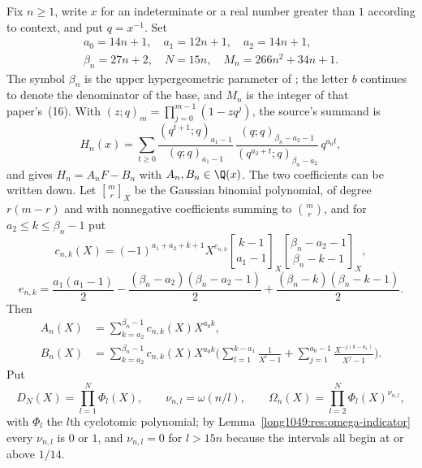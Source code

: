 \documentclass[11pt]{article}
\begin{document}
Fix $n\ge1$, write $x$ for an indeterminate or a real number greater than $1$
according to context, and put $q=x^{-1}$.  Set
\[
\begin{gathered}
 a_0=14n+1,\quad a_1=12n+1,\quad a_2=14n+1,\\
 \beta_n=27n+2,\quad N=15n,\quad M_n=266n^{2}+34n+1 .
\end{gathered}
\]
The symbol $\beta_n$ is the upper hypergeometric parameter of
\cite[Sec.~2]{zudilin2004}; the letter $b$ continues to denote the denominator
of the base, and $M_n$ is the integer of that paper's~(16).  With
$(z;q)_m=\prod_{j=0}^{m-1}(1-zq^{j})$, the source's summand is
\begin{equation}\label{long1049:eq:positive-source-form}
 H_n(x)=\sum_{t\ge0}
 \frac{(q^{t+1};q)_{a_1-1}}{(q;q)_{a_1-1}}\,
 \frac{(q;q)_{\beta_n-a_2-1}}{(q^{a_2+t};q)_{\beta_n-a_2}}\,q^{a_0t},
\end{equation}
and \cite[(8)--(11)]{zudilin2004} gives $H_n=A_nF-B_n$ with
$A_n,B_n\in\Q(x)$.  The two coefficients can be written down.  Let
$\genfrac{[}{]}{0pt}{}{m}{r}_X$ be the Gaussian binomial polynomial, of degree
$r(m-r)$ and with nonnegative coefficients summing to $\binom{m}{r}$, and for
$a_2\le k\le\beta_n-1$ put
\begin{equation}\label{long1049:eq:c-explicit}
 c_{n,k}(X)=(-1)^{a_1+a_2+k+1}X^{e_{n,k}}
 \genfrac{[}{]}{0pt}{}{k-1}{a_1-1}_X
 \genfrac{[}{]}{0pt}{}{\beta_n-a_2-1}{\beta_n-k-1}_X,
\end{equation}
\[
 e_{n,k}=\frac{a_1(a_1-1)}2-\frac{(\beta_n-a_2)(\beta_n-a_2-1)}2
 +\frac{(\beta_n-k)(\beta_n-k-1)}2 .
\]
Then
\begin{align}
 A_n(X)&=\sum_{k=a_2}^{\beta_n-1}c_{n,k}(X)X^{a_0k},\label{long1049:eq:A-explicit}\\
 B_n(X)&=\sum_{k=a_2}^{\beta_n-1}c_{n,k}(X)X^{a_0k}
 \biggl(\sum_{l=1}^{k-a_1}\frac1{X^{l}-1}
 +\sum_{j=1}^{a_0-1}\frac{X^{-j(k-a_1)}}{X^{j}-1}\biggr).\label{long1049:eq:B-explicit}
\end{align}
Put
\begin{equation}\label{long1049:eq:cyclotomic-products}
 D_N(X)=\prod_{l=1}^{N}\Phi_l(X),\qquad
 \nu_{n,l}=\omega(n/l),\qquad
 \Omega_n(X)=\prod_{l=2}^{N}\Phi_l(X)^{\nu_{n,l}},
\end{equation}
with $\Phi_l$ the $l$th cyclotomic polynomial; by
Lemma~\ref{long1049:res:omega-indicator} every $\nu_{n,l}$ is $0$ or $1$, and
$\nu_{n,l}=0$ for $l>15n$ because the intervals all begin at or above $1/14$.
\end{document}
